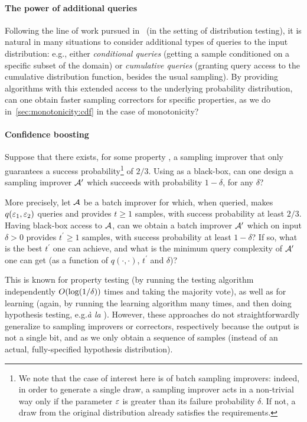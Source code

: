\paragraph{The power of additional queries}
Following the line of work pursued in~\cite{CFGM:13,CRS:14,CR:14} (in the setting of distribution testing), 
it is natural in many situations to consider additional types of queries to the input distribution: 
e.g., either \emph{conditional queries} 
(getting a sample conditioned on a specific subset of the domain) or \emph{cumulative queries} 
(granting query access to the cumulative distribution function, 
besides the usual sampling). 
By providing algorithms with this extended access to the underlying probability distribution, 
can one obtain faster sampling correctors for specific properties, as we {do} in~\cref{sec:monotonicity:cdf} in the case of monotonicity?

\paragraph{Confidence boosting}
Suppose that there exists, for some property \property, a sampling improver \Algo that only guarantees a success probability\footnote{We note that the case of interest here is of batch sampling improvers: indeed, in order to generate a single draw, a sampling improver acts in a non-trivial way only if the parameter $\varepsilon$ is greater than its failure probability $\delta$. If not, a draw from the original distribution already satisfies the requirements.} of $2/3$. Using \Algo as a black-box, can one design a sampling improver $\mathcal{A}^\prime$ which succeeds with probability $1-\delta$, for any $\delta$?

More precisely, let $\mathcal{A}$ be a batch improver for \property which, when queried, makes $q(\varepsilon_1,\varepsilon_2)$ queries and provides $t\geq 1$ samples, with success probability at least $2/3$. Having black-box access to $\mathcal{A}$, can we obtain a batch improver $\mathcal{A}^\prime$ which on input $\delta>0$ provides $t^\prime \geq 1$ samples, with success probability at least $1-\delta$? If so, what is the best $t^\prime$ one can achieve, and what is the minimum query complexity of $\mathcal{A}^\prime$ one can get (as a function of $q(\cdot,\cdot)$, $t^\prime$ and $\delta$)?

This is known for property testing (by running the testing algorithm independently $\bigO{\log(1/\delta)}$ times and taking the majority vote), 
as well as for learning (again, 
by running the learning algorithm many times, 
and then doing hypothesis testing, e.g.\xspace\emph{\`a la}  
\cite[Theorem 19]{DK:13}). 
However, these approaches do not straightforwardly 
generalize to sampling improvers or correctors, 
respectively because the output is not a single bit, 
and as we only obtain a sequence of samples (instead of an actual, 
fully-specified hypothesis distribution).
 

